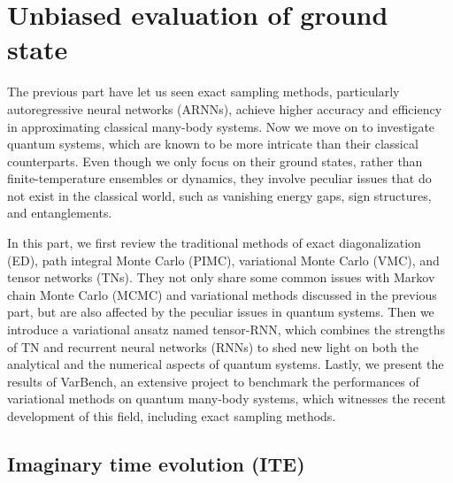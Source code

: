 \chapter{Unbiased evaluation of ground state}
\label{ch:qmc}

The previous part have let us seen exact sampling methods, particularly autoregressive neural networks (ARNNs), achieve higher accuracy and efficiency in approximating classical many-body systems. Now we move on to investigate quantum systems, which are known to be more intricate than their classical counterparts. Even though we only focus on their ground states, rather than finite-temperature ensembles or dynamics, they involve peculiar issues that do not exist in the classical world, such as vanishing energy gaps, sign structures, and entanglements.

In this part, we first review the traditional methods of exact diagonalization (ED), path integral Monte Carlo (PIMC), variational Monte Carlo (VMC), and tensor networks (TNs). They not only share some common issues with Markov chain Monte Carlo (MCMC) and variational methods discussed in the previous part, but are also affected by the peculiar issues in quantum systems. Then we introduce a variational ansatz named tensor-RNN, which combines the strengths of TN and recurrent neural networks (RNNs) to shed new light on both the analytical and the numerical aspects of quantum systems. Lastly, we present the results of VarBench, an extensive project to benchmark the performances of variational methods on quantum many-body systems, which witnesses the recent development of this field, including exact sampling methods.

\section{Imaginary time evolution (ITE)}
\label{sec:ite}

